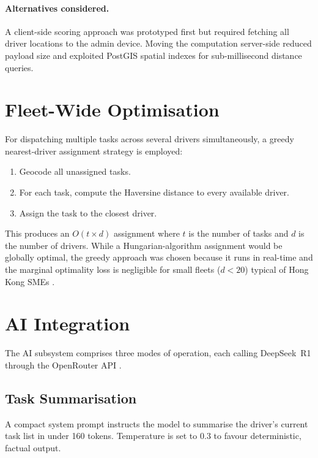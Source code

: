 \paragraph{Alternatives considered.}
A client-side scoring approach was prototyped first but required fetching all
driver locations to the admin device.  Moving the computation server-side
reduced payload size and exploited PostGIS spatial indexes for sub-millisecond
distance queries.

\section{Fleet-Wide Optimisation}
\label{sec:fleet-impl}

For dispatching multiple tasks across several drivers simultaneously, a greedy
nearest-driver assignment strategy is employed:

\begin{enumerate}
  \item Geocode all unassigned tasks.
  \item For each task, compute the Haversine distance to every available driver.
  \item Assign the task to the closest driver.
\end{enumerate}

This produces an $O(t \times d)$ assignment where $t$ is the number of tasks
and $d$ is the number of drivers.  While a Hungarian-algorithm assignment
would be globally optimal, the greedy approach was chosen because it runs in
real-time and the marginal optimality loss is negligible for small fleets
($d < 20$) typical of Hong Kong SMEs \autocite{toth2002vehicle}.

\section{AI Integration}
\label{sec:ai-impl}

The AI subsystem comprises three modes of operation, each calling DeepSeek~R1
through the OpenRouter API \autocite{openrouter2026docs}.

\subsection{Task Summarisation}
\label{sec:ai-summary}

A compact system prompt instructs the model to summarise the driver's current
task list in under 160 tokens.  Temperature is set to $0.3$ to favour
deterministic, factual output.

